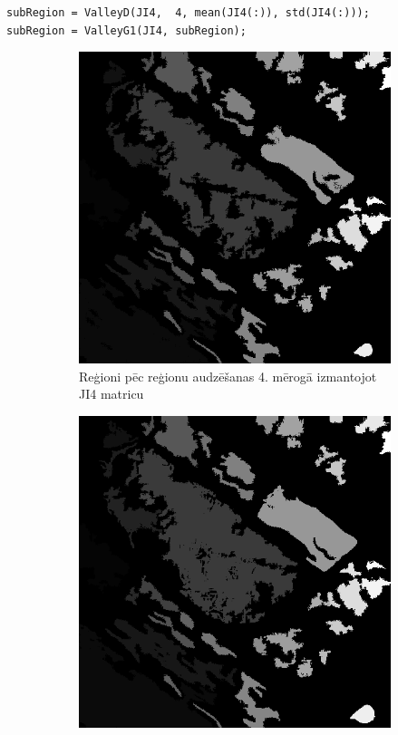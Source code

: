 \documentclass[12pt,paper=a4]{report}
\begin{document}
\begin{lstlisting}
subRegion = ValleyD(JI4,  4, mean(JI4(:)), std(JI4(:)));
subRegion = ValleyG1(JI4, subRegion);
\end{lstlisting}\par
\begin{figure}[h!]
\centering
\begin{subfigure}[b]{.3\linewidth}
\includegraphics[width=\linewidth]{regionPecValleyG1S4JI4}
\caption{Reģioni pēc reģionu audzēšanas 4. mērogā izmantojot JI4 matricu}
\label{subfig:valleyg1s4ji4}
\end{subfigure}
\begin{subfigure}[b]{.3\linewidth}
\includegraphics[width=\linewidth]{regionPecValleyG1S4JI3}

\end{subfigure}
\end{figure}
\end{document}
